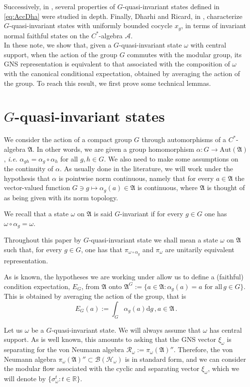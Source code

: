 \documentclass[12pt]{amsart}
\numberwithin{equation}{section}
\def\ca{{\mathcal A}}
\def\cb{{\mathcal B}}
\def\ch{{\mathcal H}}
\def\ga{{\mathfrak A}} \def\gpa{{\mathfrak a}}
\def\a{\alpha}
\def\p{\pi}
\def\s{\sigma} \def\S{\Sigma}
\def\om{\omega} \def\Om{\Omega}
\theoremstyle{definition}
\begin{document}
Successively, in \cite{DKY}, several properties of $G$-quasi-invariant states defined in \eqref{eq:AccDha} were studied in depth. Finally, Dharhi and Ricard, in \cite{DR}, characterize $G$-quasi-invariant states with uniformly bounded cocycle $x_g$, in terms of invariant normal faithful states on the $C^*$-algebra $\ca$.\\ 
In these note, we show that, given a $G$-quasi-invariant state $\om$ with central support, when the action of the group $G$ commutes with the modular group, its GNS representation is equivalent to that associated with the composition of $\om$ with the canonical conditional expectation, obtained by averaging the action of the group. To reach this result, we first prove some technical lemmas.   

\section{$G$-quasi-invariant states}

We consider the action of a compact group $G$ through automorphisms of a $C^*$-algebra
$\ga$. In other words, we are given a group homomorphism
$\a: G\rightarrow\textrm{Aut}(\ga)$, \emph{i.e.} $\a_{gh}=\a_g\circ \a_h$ for all $g, h\in G$.
We also need to make some assumptions on the continuity of $\a$. As usually done in the literature, we will work under the hypothesis
that $\a$ is pointwise norm continuous, namely that for every $a\in\ga$  the vector-valued function
$ G\ni g\mapsto \a_g(a)\in\ga$ is continuous, where $\ga$ is thought of as being given with its norm topology.

We recall that a  state $\om$ on $\ga$ is said $G$-invariant if for every $g\in G$ one has
$\om\circ\a_g=\om$.

Throughout this paper by $G$-quasi-invariant state we shall mean a state $\om$ on $\ga$ such that, for every $g\in G$, one has
that $\p_{\om\circ\a_g}$ and $\pi_	\om$ are unitarily equivalent representation.

As is known, the hypotheses we are working under allow us to define a (faithful) condition expectation, $E_G$, from
$\ga$ onto $\ga^G:=\{a\in\ga: \a_g(a)=a\,\,\textrm{for all}\, g\in G\}$. This is obtained by averaging the action of the group, that is
$$E_G(a):=\int_G \a_g(a)\textrm{d}g\, , a\in\ga\, .$$

Let us $\om$ be a $G$-quasi-invariant state. We will always assume that $\om$ has central support.
As is well known, this amounts to asking that the GNS vector $\xi_\om$ is separating for
the von Neumann algebra $\mathcal{R}_\om:=\pi_\om(\ga)''$. Therefore, the von Neumann algebra
$\pi_\om(\ga)''\subset \cb(\ch_\om)$ is in standard form, and we can consider the modular flow
associated with the cyclic and separating vector $\xi_\om$, which we will denote by
$\{\s_\om^t: t\in\mathbb{R}\}$.
\end{document}
